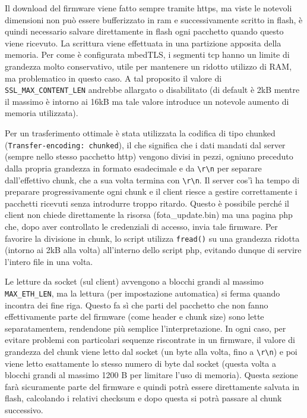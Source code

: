 
Il download del firmware viene fatto sempre tramite https, ma viste le notevoli dimensioni non pu\`o essere bufferizzato in ram e successivamente scritto in flash, \`e quindi necessario salvare direttamente in flash ogni pacchetto quando questo viene ricevuto. La scrittura viene effettuata in una partizione apposita della memoria. Per come \`e configurata mbedTLS, i segmenti tcp hanno un limite di grandezza molto conservativo, utile per mantenere un ridotto utilizzo di RAM, ma problematico in questo caso. A tal proposito il valore di \texttt{SSL\_MAX\_CONTENT\_LEN} andrebbe allargato o disabilitato (di default \`e 2kB mentre il massimo \`e intorno ai 16kB ma tale valore introduce un notevole aumento di memoria utilizzata). 

Per un trasferimento ottimale \`e stata utilizzata la codifica di tipo chunked (\texttt{Transfer-encoding: chunked}), il che significa che i dati mandati dal server (sempre nello stesso pacchetto http) vengono divisi in pezzi, ogniuno preceduto dalla propria grandezza in formato esadecimale e da \texttt{\textbackslash{r}\textbackslash{n}} per separare dall'effettivo chunk, che a sua volta termina con \texttt{\textbackslash{r}\textbackslash{n}}. Il server cos'\`i ha tempo di preparare progressivamente ogni chunk e il client riesce a gestire correttamente i pacchetti ricevuti senza introdurre troppo ritardo. Questo \`e possibile perch\'e il client non chiede direttamente la risorsa (fota\_update.bin) ma una pagina php che, dopo aver controllato le credenziali di accesso, invia tale firmware. Per favorire la divisione in chunk, lo script utilizza \texttt{fread()} su una grandezza ridotta (intorno ai 2kB alla volta) all'interno dello script php, evitando dunque di servire l'intero file in una volta.

Le letture da socket (sul client) avvengono a blocchi grandi al massimo \texttt{MAX\_ETH\_LEN}, ma la lettura (per impostazione automatica) si ferma quando incontra dei fine riga. Questo fa s\`i che parti del pacchetto che non fanno effettivamente parte del firmware (come header e chunk size) sono lette separatamentem, rendendone pi\`u semplice l'interpretazione. In ogni caso, per evitare problemi con particolari sequenze riscontrate in un firmware, il valore di grandezza del chunk viene letto dal socket (un byte alla volta, fino a \texttt{\textbackslash{r}\textbackslash{n}}) e poi viene letto esattamente lo stesso numero di byte dal socket (questa volta a blocchi grandi al massimo 1200 B per limitare l'uso di memoria). Questa sezione far\`a sicuramente parte del firmware e quindi potr\`a essere direttamente salvata in flash, calcolando i relativi checksum e dopo questa si potr\`a passare al chunk successivo.

